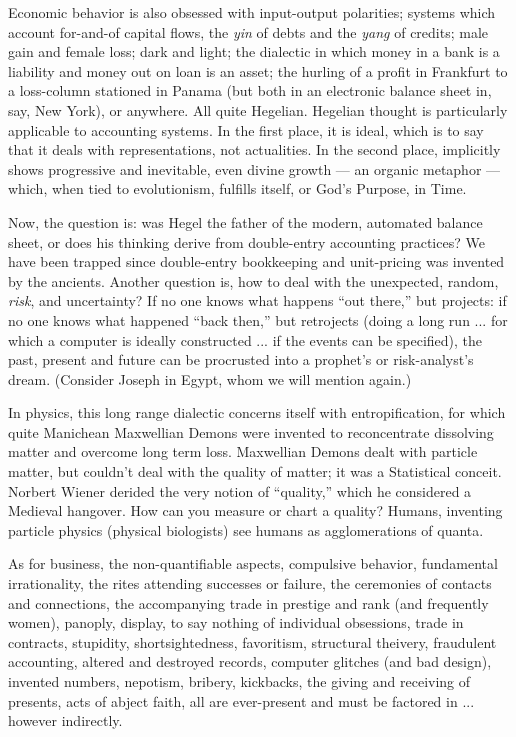 Economic behavior is also obsessed with input-output polarities; systems which account for-and-of capital flows, the \emph{yin} of debts and the \emph{yang} of credits; male gain and female loss; dark and light; the dialectic in which money in a bank is a liability and money out on loan is an asset; the hurling of a profit in Frankfurt to a loss-column stationed in Panama (but both in an electronic balance sheet in, say, New York), or anywhere. All quite Hegelian. Hegelian thought is particularly applicable to accounting systems. In the first place, it is ideal, which is to say that it deals with representations, not actualities. In the second place, implicitly shows progressive and inevitable, even divine growth --- an organic metaphor --- which, when tied to evolutionism, fulfills itself, or God's Purpose, in Time.

Now, the question is: was Hegel the father of the modern, automated balance sheet, or does his thinking derive from double-entry accounting practices? We have been trapped since double-entry bookkeeping and unit-pricing was invented by the ancients. Another question is, how to deal with the unexpected, random, \emph{risk}, and uncertainty? If no one knows what happens \enquote{out there,} but projects: if no one knows what happened \enquote{back then,} but retrojects (doing a long run ... for which a computer is ideally constructed ... if the events can be specified), the past, present and future can be procrusted into a prophet's or risk-analyst's dream. (Consider Joseph in Egypt, whom we will mention again.)

In physics, this long range dialectic concerns itself with entropification, for which quite Manichean Maxwellian Demons were invented to reconcentrate dissolving matter and overcome long term loss. Maxwellian Demons dealt with particle matter, but couldn't deal with the quality of matter; it was a Statistical conceit. Norbert Wiener derided the very notion of \enquote{quality,} which he considered a Medieval hangover. How can you measure or chart a quality? Humans, inventing particle physics (physical biologists) see humans as agglomerations of quanta.

As for business, the non-quantifiable aspects, compulsive behavior, fundamental irrationality, the rites attending successes or failure, the ceremonies of contacts and connections, the accompanying trade in prestige and rank (and frequently women), panoply, display, to say nothing of individual obsessions, trade in contracts, stupidity, shortsightedness, favoritism, structural theivery, fraudulent accounting, altered and destroyed records, computer glitches (and bad design), invented numbers, nepotism, bribery, kickbacks, the giving and receiving of presents, acts of abject faith, all are ever-present and must be factored in ... however indirectly.

